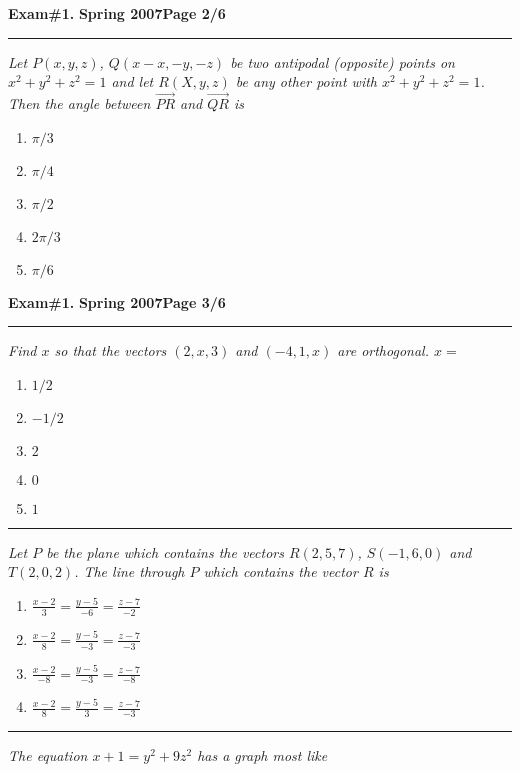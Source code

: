 \documentclass[12pt]{article}
\begin{document}
\hfill{\large\bf Exam\#1.}\hfill{\large\bf
  Spring 2007}\hfill{\large\bf Page 2/6}\hrule

\bigskip
{\problem[10 pts] \em Let $P(x,y,z)$, $Q(x-x,-y,-z)$ be two antipodal
  (opposite) points on $x^2+y^2+z^2=1$ and let $R(X,y,z)$ be any other
  point with $x^2+y^2+z^2=1$.  Then the angle between
  $\overrightarrow{PR}$ and $\overrightarrow{QR}$
  is}
\begin{enumerate}
\item $\pi/3$
\item $\pi/4$
\item $\pi/2$
\item $2\pi/3$
\item $\pi/6$
\end{enumerate}
\newpage

\hfill{\large\bf Exam\#1.}\hfill{\large\bf
  Spring 2007}\hfill{\large\bf Page 3/6}\hrule

\bigskip
{\problem[8pts] \em Find $x$ so that the vectors $(2,x,3)$ and
  $(-4,1,x)$ are orthogonal. $x=$}
\begin{enumerate}
\item $1/2$
\item $-1/2$
\item $2$
\item $0$
\item $1$
\end{enumerate}
\vspace{2cm}
\hrule

{\problem[10 pts] \em Let $P$ be the plane which contains the vectors
  $R(2,5,7)$, $S(-1,6,0)$ and $T(2,0,2)$.  The line through $P$ which
  contains the vector $R$ is}
\begin{enumerate}
\item $\displaystyle{\frac{x-2}{3} = \frac{y-5}{-6} = \frac{z-7}{-2}}$
\item $\displaystyle{\frac{x-2}{8} = \frac{y-5}{-3} = \frac{z-7}{-3}}$
\item $\displaystyle{\frac{x-2}{-8} = \frac{y-5}{-3} = \frac{z-7}{-8}}$
\item $\displaystyle{\frac{x-2}{8} = \frac{y-5}{3} = \frac{z-7}{-3}}$
\end{enumerate}
\vspace{2cm}
\hrule

{\problem[10 pts] \em The equation $x+1 = y^2+9z^2$ has a graph most like}
 \begin{center}
 \end{center}
\newpage
\end{document}
